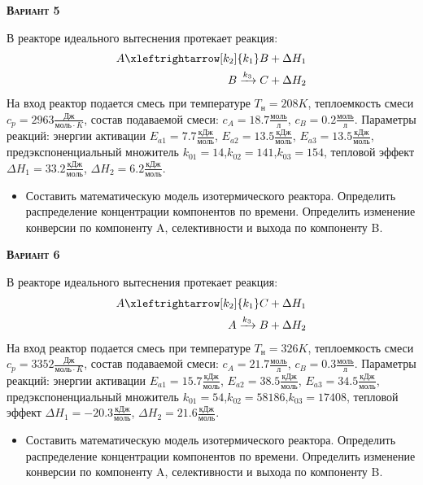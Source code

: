 \textsc{\textbf{Вариант 5}}

 В реакторе идеального вытеснения протекает реакция: \begin{equation*} \begin{aligned} A \xleftrightarrow[k_2]{k_1} B + \Delta H_1 \\ B \xrightarrow{k_3} C + \Delta H_2 \end{aligned} \end{equation*}                              На вход  реактор подается смесь при температуре $ T_{н} =  208 K$, теплоемкость смеси $c_p= 2963 \frac{Дж}{моль \cdot K}$, состав подаваемой смеси: $c_A=18.7 \frac{моль}{л}$, $c_B=0.2 \frac{моль}{л}$. Параметры реакций: энергии активации $E_{a1}= 7.7 \frac{кДж}{моль}$, $E_{a2}=13.5  \frac{кДж}{моль}$, $E_{a3}=13.5  \frac{кДж}{моль}$, предэкспоненциальный множитель $k_{01}=        14$,$k_{02}=       141$,$k_{03}=       154$, тепловой эффект $\Delta H_1= 33.2  \frac{кДж}{моль}$, $\Delta H_2= 6.2 \frac{кДж}{моль}$.\begin{itemize} \item Составить математическую модель изотермического реактора. Определить распределение концентрации компонентов по времени. Определить изменение конверсии по компоненту A, селективности и выхода по компоненту B. \end{itemize}

\textsc{\textbf{Вариант 6}}

 В реакторе идеального вытеснения протекает реакция: \begin{equation*} \begin{aligned} A \xleftrightarrow[k_2]{k_1} C + \Delta H_1 \\ A \xrightarrow{k_3} B + \Delta H_2 \end{aligned} \end{equation*}                              На вход  реактор подается смесь при температуре $ T_{н} =  326 K$, теплоемкость смеси $c_p= 3352 \frac{Дж}{моль \cdot K}$, состав подаваемой смеси: $c_A=21.7 \frac{моль}{л}$, $c_B=0.3 \frac{моль}{л}$. Параметры реакций: энергии активации $E_{a1}=15.7 \frac{кДж}{моль}$, $E_{a2}=38.5  \frac{кДж}{моль}$, $E_{a3}=34.5  \frac{кДж}{моль}$, предэкспоненциальный множитель $k_{01}=        54$,$k_{02}=     58186$,$k_{03}=     17408$, тепловой эффект $\Delta H_1= -20.3  \frac{кДж}{моль}$, $\Delta H_2=21.6 \frac{кДж}{моль}$.\begin{itemize} \item Составить математическую модель изотермического реактора. Определить распределение концентрации компонентов по времени. Определить изменение конверсии по компоненту A, селективности и выхода по компоненту B. \end{itemize}

